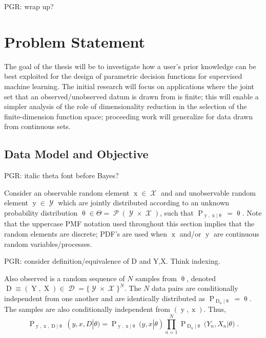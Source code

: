 \documentclass[12pt]{article}
\DeclareMathOperator{\xrm}{\mathrm{x}}
\DeclareMathOperator{\Xrm}{\mathrm{X}}
\DeclareMathOperator{\yrm}{\mathrm{y}}
\DeclareMathOperator{\Yrm}{\mathrm{Y}}
\DeclareMathOperator{\Drm}{\mathrm{D}}
\DeclareMathOperator{\Prm}{\mathrm{P}}
\DeclareMathOperator{\Xcal}{\mathcal{X}}
\DeclareMathOperator{\Ycal}{\mathcal{Y}}
\DeclareMathOperator{\Dcal}{\mathcal{D}}
\DeclareMathOperator{\Pcal}{\mathcal{P}}
\begin{document}
PGR: wrap up?











\newpage
\section{Problem Statement} \label{sec:prob}

The goal of the thesis will be to investigate how a user's prior knowledge can be best exploited for the design of parametric decision functions for supervised machine learning. The initial research will focus on applications where the joint set that an observed/unobserved datum is drawn from is finite; this will enable a simpler analysis of the role of dimensionality reduction in the selection of the finite-dimension function space; proceeding work will generalize for data drawn from continuous sets.


\subsection{Data Model and Objective}

PGR: italic theta font before Bayes?

Consider an observable random element $\xrm \in \Xcal$ and and unobservable random element $\yrm \in \Ycal$ which are jointly distributed according to an unknown probability distribution $\uptheta \in \Theta = \Pcal(\Ycal \times \Xcal)$, such that $\Prm_{\yrm,\xrm | \uptheta} = \uptheta$. Note that the uppercase PMF notation used throughout this section implies that the random elements are discrete; PDF's are used when $\xrm$ and/or $\yrm$ are continuous random variables/processes.

PGR: consider definition/equivalence of D and Y,X. Think indexing.

Also observed is a random sequence of $N$ samples from $\uptheta$, denoted $\Drm \equiv ( \Yrm,\Xrm ) \in \Dcal = \{\Ycal \times \Xcal\}^N$. The $N$ data pairs are conditionally independent from one another and are identically distributed as $\Prm_{\Drm_n | \uptheta} = \uptheta$. The samples are also conditionally independent from $(\yrm,\xrm)$. Thus,
\begin{equation}
\Prm_{\yrm,\xrm,\Drm | \uptheta}(y,x,D | \theta) = \Prm_{\yrm,\xrm | \uptheta}(y,x | \theta) \prod_{n=1}^N \Prm_{\Drm_n | \uptheta}\big(Y_n,X_n | \theta\big) \;.
\end{equation}
\end{document}
